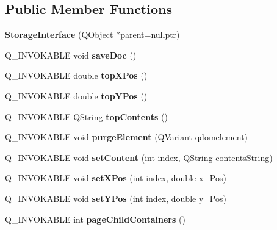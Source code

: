 \subsection*{Public Member Functions}
\begin{DoxyCompactItemize}
\item 
\mbox{\label{classStorageInterface_a7586bb58eb326e9746e56762dc1e274e}} 
{\bfseries Storage\+Interface} (Q\+Object $\ast$parent=nullptr)
\item 
\mbox{\label{classStorageInterface_ad603f4c3282cbf80bbf4bba5fbd27ad3}} 
Q\+\_\+\+I\+N\+V\+O\+K\+A\+B\+LE void {\bfseries save\+Doc} ()
\item 
\mbox{\label{classStorageInterface_a51d75b4fdc7fdf2cbbe4c6c8e9963531}} 
Q\+\_\+\+I\+N\+V\+O\+K\+A\+B\+LE double {\bfseries top\+X\+Pos} ()
\item 
\mbox{\label{classStorageInterface_a101e97200cce19b0171255139ddc347c}} 
Q\+\_\+\+I\+N\+V\+O\+K\+A\+B\+LE double {\bfseries top\+Y\+Pos} ()
\item 
\mbox{\label{classStorageInterface_ad41bc8b449de097657e361762cc38ba2}} 
Q\+\_\+\+I\+N\+V\+O\+K\+A\+B\+LE Q\+String {\bfseries top\+Contents} ()
\item 
\mbox{\label{classStorageInterface_a0688904dc97ecb5f1693633744e7d065}} 
Q\+\_\+\+I\+N\+V\+O\+K\+A\+B\+LE void {\bfseries purge\+Element} (Q\+Variant qdomelement)
\item 
\mbox{\label{classStorageInterface_a1616fb52651a1aa8b56431ac91f65b40}} 
Q\+\_\+\+I\+N\+V\+O\+K\+A\+B\+LE void {\bfseries set\+Content} (int index, Q\+String contents\+String)
\item 
\mbox{\label{classStorageInterface_a27e8bcbd40aaa6fd224eff3e9a667499}} 
Q\+\_\+\+I\+N\+V\+O\+K\+A\+B\+LE void {\bfseries set\+X\+Pos} (int index, double x\+\_\+\+Pos)
\item 
\mbox{\label{classStorageInterface_a5e517d8704b5ffb89c819e0dd5145fe3}} 
Q\+\_\+\+I\+N\+V\+O\+K\+A\+B\+LE void {\bfseries set\+Y\+Pos} (int index, double y\+\_\+\+Pos)
\item 
\mbox{\label{classStorageInterface_af9e9c5ed5fbc7f85a8fdf446a496498f}} 
Q\+\_\+\+I\+N\+V\+O\+K\+A\+B\+LE int {\bfseries page\+Child\+Containers} ()
\end{DoxyCompactItemize}
